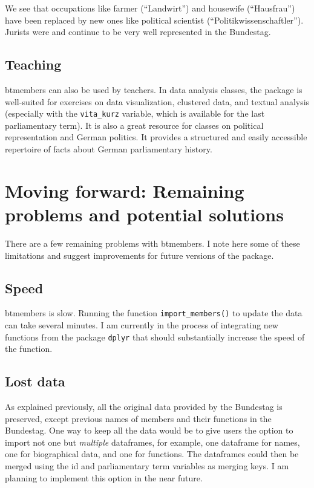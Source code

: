 \documentclass[12pt]{article}
\begin{document}
We see that occupations like farmer (``Landwirt'') and housewife
(``Hausfrau'') have been replaced by new ones like political scientist
(``Politikwissenschaftler''). Jurists were and continue to be very well
represented in the Bundestag.

\hypertarget{teaching}{%
\subsection{Teaching}\label{teaching}}

btmembers can also be used by teachers. In data analysis classes, the
package is well-suited for exercises on data visualization, clustered
data, and textual analysis (especially with the \texttt{vita\_kurz}
variable, which is available for the last parliamentary term). It is
also a great resource for classes on political representation and German
politics. It provides a structured and easily accessible repertoire of
facts about German parliamentary history.

\hypertarget{moving-forward-remaining-problems-and-potential-solutions}{%
\section{Moving forward: Remaining problems and potential
solutions}\label{moving-forward-remaining-problems-and-potential-solutions}}

There are a few remaining problems with btmembers. I note here some of
these limitations and suggest improvements for future versions of the
package.

\hypertarget{speed}{%
\subsection{Speed}\label{speed}}

btmembers is slow. Running the function \texttt{import\_members()} to
update the data can take several minutes. I am currently in the process
of integrating new functions from the package \texttt{dplyr} that should
substantially increase the speed of the function.

\hypertarget{lost-data}{%
\subsection{Lost data}\label{lost-data}}

As explained previously, all the original data provided by the Bundestag
is preserved, except previous names of members and their functions in
the Bundestag. One way to keep all the data would be to give users the
option to import not one but \emph{multiple} dataframes, for example,
one dataframe for names, one for biographical data, and one for
functions. The dataframes could then be merged using the id and
parliamentary term variables as merging keys. I am planning to implement
this option in the near future.
\end{document}
